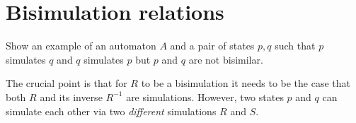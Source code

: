 \section*{Bisimulation relations}

\begin{exercise}
    Show an example of an automaton $A$ and a pair of states $p, q$
    such that $p$ simulates $q$ and $q$ simulates $p$ but $p$ and $q$ are not bisimilar.
\end{exercise}
\begin{solution}
    The crucial point is that for $R$ to be a bisimulation
    it needs to be the case that both $R$ and its inverse $R^{-1}$ are simulations.
    However, two states $p$ and $q$ can simulate each other via two \emph{different} simulations $R$ and $S$.
\end{solution}




